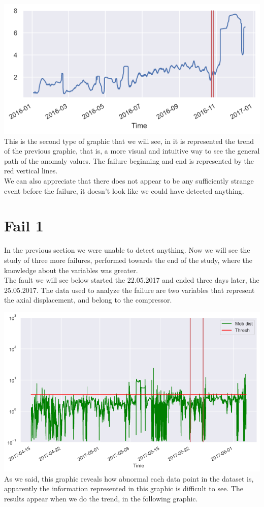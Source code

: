 \documentclass[
]{article}
\begin{document}
\includegraphics{relevant_graphs/4_4_T.png} This is the second type of
graphic that we will see, in it is represented the trend of the previous
graphic, that is, a more visual and intuitive way to see the general
path of the anomaly values. The failure beginning and end is represented
by the red vertical lines.\\
We can also appreciate that there does not appear to be any sufficiently
strange event before the failure, it doesn't look like we could have
detected anything.

\hypertarget{fail-1}{%
\section{Fail 1}\label{fail-1}}

In the previous section we were unable to detect anything. Now we will
see the study of three more failures, performed towards the end of the
study, where the knowledge about the variables was greater.\\
The fault we will see below started the 22.05.2017 and ended three days
later, the 25.05.2017. The data used to analyze the failure are two
variables that represent the axial displacement, and belong to the
compressor.

\includegraphics{relevant_graphs/6_1_AM.png} As we said, this graphic
reveals how abnormal each data point in the dataset is, apparently the
information represented in this graphic is difficult to see. The results
appear when we do the trend, in the following graphic.
\end{document}
